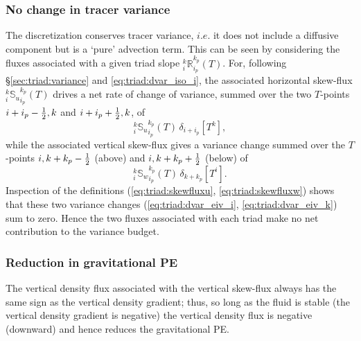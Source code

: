 \documentclass[NEMO_book]{subfiles}
\begin{document}
\subsubsection{No change in tracer variance}
The discretization conserves tracer variance, $i.e.$ it does not
include a diffusive component but is a `pure' advection term. This can
be seen
by considering the
fluxes associated with a given triad slope
$_i^k{\mathbb{R}}_{i_p}^{k_p} (T)$. For, following
\S\ref{sec:triad:variance} and \eqref{eq:triad:dvar_iso_i}, the
associated horizontal skew-flux $_i^k{\mathbb{S}_u}_{i_p}^{k_p} (T)$
drives a net rate of change of variance, summed over the two
$T$-points $i+i_p-\textstyle\frac{1}{2},k$ and $i+i_p+\textstyle\frac{1}{2},k$, of
\begin{equation}
\label{eq:triad:dvar_eiv_i}
  _i^k{\mathbb{S}_u}_{i_p}^{k_p} (T)\,\delta_{i+ i_p}[T^k],
\end{equation}
while the associated vertical skew-flux gives a variance change summed over the
$T$-points $i,k+k_p-\textstyle\frac{1}{2}$ (above) and $i,k+k_p+\textstyle\frac{1}{2}$ (below) of
\begin{equation}
\label{eq:triad:dvar_eiv_k}
  _i^k{\mathbb{S}_w}_{i_p}^{k_p} (T) \,\delta_{k+ k_p}[T^i].
\end{equation}
Inspection of the definitions (\ref{eq:triad:skewfluxu}, \ref{eq:triad:skewfluxw})
shows that these two variance changes (\ref{eq:triad:dvar_eiv_i}, \ref{eq:triad:dvar_eiv_k})
sum to zero. Hence the two fluxes associated with each triad make no
net contribution to the variance budget.

\subsubsection{Reduction in gravitational PE}
The vertical density flux associated with the vertical skew-flux
always has the same sign as the vertical density gradient; thus, so
long as the fluid is stable (the vertical density gradient is
negative) the vertical density flux is negative (downward) and hence
reduces the gravitational PE.
\end{document}
